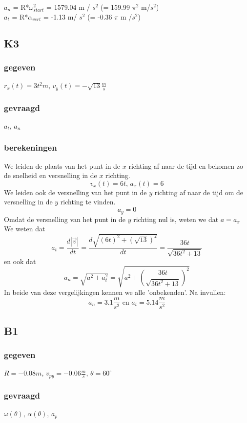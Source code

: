 \documentclass[10pt,a4paper]{article}
\begin{document}
\noindent$a_n$ = R*$\omega_{start}^2$ = 1579.04 m / $s^2$ (= 159.99 $\pi^2$ m/$s^2$)\\
$a_t$ = R*$\alpha_{vert}$ = -1.13 m/ $s^2$ (= -0.36 $\pi$ m /$s^2$)
\subsection{K3}
\subsubsection*{gegeven}
$r_{x}(t) = 3t^{2} m$,
$v_{y}(t)= -\sqrt{13} \frac{m}{s}$
\subsubsection*{gevraagd}
$a_{t}$, $a_{n}$
\subsubsection*{berekeningen}
We leiden de plaats van het punt in de $x$ richting af naar de tijd en bekomen zo de snelheid en versnelling in de $x$ richting.
\[v_{x}(t)=6t\text{, }a_{x}(t) = 6\]
We leiden ook de versnelling van het punt in de $y$ richting af naar de tijd om de versnelling in de $y$ richting te vinden.
\[
a_{y} = 0
\]
Omdat de versnelling van het punt in de $y$ richting nul is, weten we dat $a = a_{x}$
\\We weten dat
\[
a_{t} = \frac{d|\vec{v}|}{dt} = \frac{d\sqrt{(6t)^{2} + (\sqrt{13})^{2}}}{dt} = \frac{36t}{\sqrt{36t^{2}+13}}
\]
en ook dat
\[
a_{n} = \sqrt{a^{2} + a_{t}^{2}} = \sqrt{a^{2} + \left(\frac{36t}{\sqrt{36t^{2}+13}}\right)^{2}}
\]
In beide van deze vergelijkingen kennen we alle 'onbekenden'. Na invullen:
\[
a_{n} = 3.1\frac{m}{s^{2}} \text{ en } a_{t} = 5.14\frac{m}{s^{2}}
\]

\subsection{B1}
\subsubsection*{gegeven}
$R=-0.08m$, $v_{py} = -0.06 \frac{m}{s}$, $\theta = 60^\circ$
\subsubsection*{gevraagd}
$\omega(\theta)$, $\alpha(\theta)$, $a_{p}$
\end{document}
